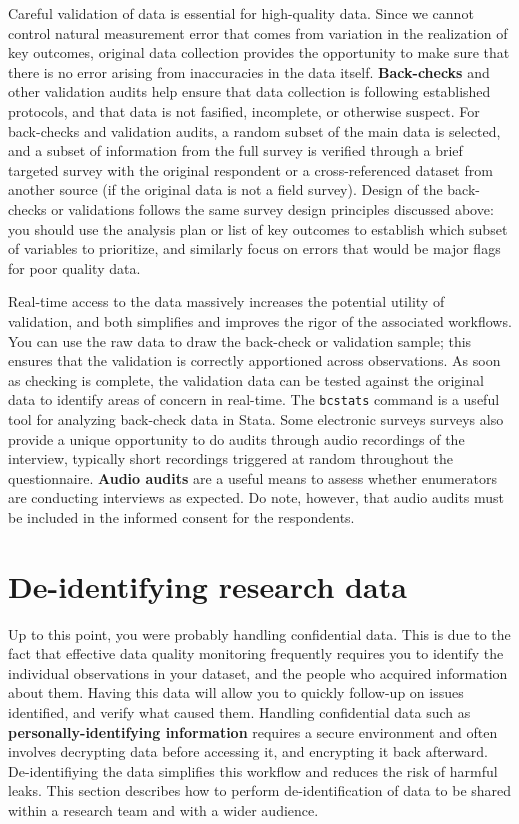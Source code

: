 Careful validation of data is essential for high-quality data.
Since we cannot control natural measurement error
that comes from variation in the realization of key outcomes,
original data collection provides the opportunity to make sure
that there is no error arising from inaccuracies in the data itself.
\textbf{Back-checks} and
other validation audits help ensure that data collection is following established protocols,
and that data is not fasified, incomplete, or otherwise suspect.
For back-checks and validation audits, a random subset of the main data is selected,
and a subset of information from the full survey is
verified through a brief targeted survey with the original respondent
or a cross-referenced dataset from another source (if the original data is not a field survey).
Design of the back-checks or validations follows the same survey design
principles discussed above: you should use the analysis plan
or list of key outcomes to establish which subset of variables to prioritize,
and similarly focus on errors that would be major flags for poor quality data.

Real-time access to the data massively increases the potential utility of validation,
and both simplifies and improves the rigor of the associated workflows.
You can use the raw data to draw the back-check or validation sample;
this ensures that the validation is correctly apportioned across observations.
As soon as checking is complete, the validation data can be tested against
the original data to identify areas of concern in real-time.
The \texttt{bcstats} command is a useful tool for analyzing back-check data in Stata.
Some electronic surveys surveys also provide a unique opportunity
to do audits through audio recordings of the interview,
typically short recordings triggered at random throughout the questionnaire.
\textbf{Audio audits} are a useful means to assess whether enumerators are conducting interviews as expected.
Do note, however, that audio audits must be included in the informed consent for the respondents.


\section{De-identifying research data}

Up to this point, you were probably handling confidential data.
This is due to the fact that effective data quality monitoring
frequently requires you to identify the individual observations in your dataset,
and the people who acquired information about them.
Having this data will allow you to quickly follow-up on issues identified,
and verify what caused them.
Handling confidential data such as \textbf{personally-identifying information}
requires a secure environment and often involves
decrypting data before accessing it, and encrypting it back afterward.
De-identifiying the data simplifies this workflow and reduces the risk of harmful leaks.
This section describes how to perform de-identification of data 
to be shared within a research team and with a wider audience.

